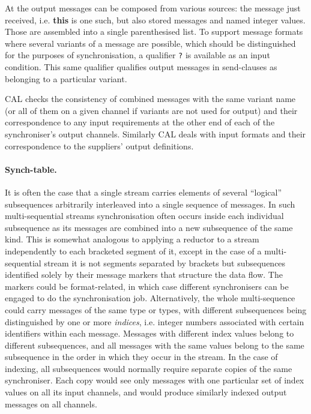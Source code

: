\documentclass[11pt]{report}
\begin{document}
At the output messages can be composed from various sources: the message just received, i.e. {\bf this} is one such, but also stored messages and named integer values. Those are assembled into a single parenthesised list. To support message formats where several variants of a message are possible, which should be distinguished for the purposes of synchronisation, a qualifier \verb"?" is available as an input condition. This same qualifier qualifies output messages in send-clauses as belonging to a particular variant.

CAL checks the consistency of combined messages with the same variant name (or all of them on a given channel if variants are not used for output) and their correspondence to any input requirements at the other end of each of the synchroniser's output channels. Similarly CAL deals with input formats and their correspondence to the suppliers' output definitions.

\paragraph{Synch-table.}It is often the case that a single stream carries elements of several ``logical'' subsequences arbitrarily interleaved into a single sequence of messages. In such multi-sequential streams synchronisation often occurs inside each individual subsequence as its messages are combined   into a new subsequence of the same kind. This is somewhat analogous to applying a reductor to a stream independently to each bracketed segment of it, except in the case of a multi-sequential stream it is not segments separated by brackets but subsequences identified solely by their message markers that structure the data flow. The markers could be format-related, in which case different synchronisers can be engaged to do the synchronisation job. Alternatively, the whole multi-sequence could carry messages of the same type or types, with different subsequences being distinguished by one or more {\em indices}, i.e. integer numbers associated with certain identifiers within each message. Messages with different index values belong to different subsequences, and all messages with the same values belong to the same subsequence in the order in which they occur in the stream. In the case of indexing, all subsequences would normally require separate copies of the same synchroniser. Each copy would see only messages with one particular set of index values on all its input channels, and would produce similarly indexed output messages on all channels.
\end{document}
